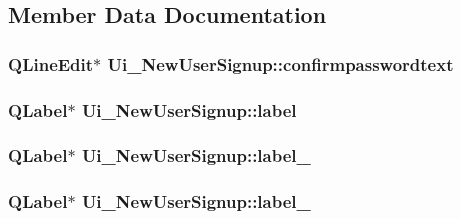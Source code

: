 \subsection{Member Data Documentation}
\hypertarget{classUi__NewUserSignup_ad2dc6efba8842a8ee00a1250b3da01c5}{
\subsubsection[{confirmpasswordtext}]{\setlength{\rightskip}{0pt plus 5cm}Q\-Line\-Edit$\ast$ Ui\-\_\-\-New\-User\-Signup\-::confirmpasswordtext}}\label{classUi__NewUserSignup_ad2dc6efba8842a8ee00a1250b3da01c5}
\hypertarget{classUi__NewUserSignup_ad0afab1ec9721aef3dcd9bcff64ebb20}{
\subsubsection[{label}]{\setlength{\rightskip}{0pt plus 5cm}Q\-Label$\ast$ Ui\-\_\-\-New\-User\-Signup\-::label}}\label{classUi__NewUserSignup_ad0afab1ec9721aef3dcd9bcff64ebb20}
\hypertarget{classUi__NewUserSignup_a98d4c3eba23e7b0198acfc53ba33bf38}{
\subsubsection[{label\-\_\-3}]{\setlength{\rightskip}{0pt plus 5cm}Q\-Label$\ast$ Ui\-\_\-\-New\-User\-Signup\-::label\-\_}}\label{classUi__NewUserSignup_a98d4c3eba23e7b0198acfc53ba33bf38}
\hypertarget{classUi__NewUserSignup_aabe80337b0792454f09869e840bdf714}{
\subsubsection[{label\-\_\-4}]{\setlength{\rightskip}{0pt plus 5cm}Q\-Label$\ast$ Ui\-\_\-\-New\-User\-Signup\-::label\-\_}}\label{classUi__NewUserSignup_aabe80337b0792454f09869e840bdf714}
